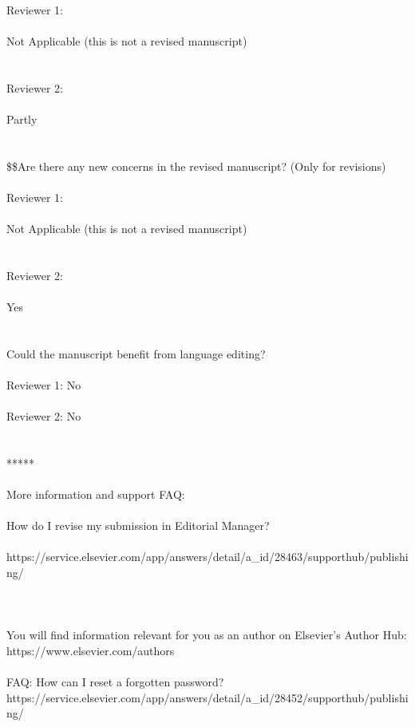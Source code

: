 {\\
Reviewer 1:\\
\\
Not Applicable (this is not a revised manuscript)\\
\\
\\
Reviewer 2:\\
\\
Partly\\
\\
\\
\$\$Are there any new concerns in the revised manuscript? (Only for revisions)\\
\\
Reviewer 1:\\
\\
Not Applicable (this is not a revised manuscript)\\
\\
\\
Reviewer 2:\\
\\
Yes\\
\\
\\
Could the manuscript benefit from language editing?\\
\\
Reviewer 1: No\\
\\
Reviewer 2: No\\
\\
\\
*****\\
\\
More information and support FAQ:\\
\\
How do I revise my submission in Editorial Manager?\\
\\
https://service.elsevier.com/app/answers/detail/a\_id/28463/supporthub/publishing/\\
\\
\\
\\
You will find information relevant for you as an author on Elsevier’s Author Hub: https://www.elsevier.com/authors\\
\\
FAQ: How can I reset a forgotten password?\\
https://service.elsevier.com/app/answers/detail/a\_id/28452/supporthub/publishing/\\
}
